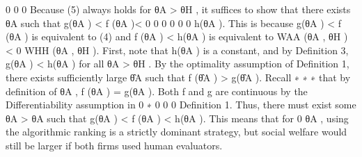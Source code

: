 \documentclass[10pt]{article}
\begin{document}
\begin{ReviewVerbatim}
0
0
0
Because (5) always holds for θA > θH , it suffices to show that there exists θA
such that g(θA
) < f (θA
)<
0
0
0
0
0
0
h(θA ). This is because g(θA ) < f (θA ) is equivalent to (4) and f (θA ) < h(θA ) is equivalent to WAA (θA , θH ) <
0
WHH (θA
, θH ).
First, note that h(θA ) is a constant, and by Definition 3, g(θA ) < h(θA ) for all θA > θH . By the
optimality assumption of Definition 1, there exists sufficiently large θ̂A such that f (θ̂A ) > g(θ̂A ). Recall
∗
∗
∗
that by definition of θA
, f (θA
) = g(θA
). Both f and g are continuous by the Differentiability assumption in
0
∗
0
0
0
Definition 1. Thus, there must exist some θA
> θA
such that g(θA
) < f (θA
) < h(θA
). This means that for
0
θA , using the algorithmic ranking is a strictly dominant strategy, but social welfare would still be larger if
both firms used human evaluators.
\end{ReviewVerbatim}
\end{document}
